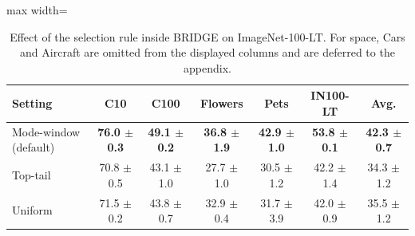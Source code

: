 \begin{table}[t]
\centering
\scriptsize
\setlength{\tabcolsep}{3.5pt}
\caption{Effect of the selection rule inside BRIDGE on ImageNet-100-LT. For space, Cars and Aircraft are omitted from the displayed columns and are deferred to the appendix.}
\label{tab:main_ablation_selection}
\begin{adjustbox}{max width=\textwidth}
\begin{tabular}{l c c c c c c}
\toprule
Setting & C10 & C100 & Flowers & Pets & IN100-LT & Avg. \\
\midrule
Mode-window (default) & \textbf{76.0 {\scriptsize$\pm$ 0.3}} & \textbf{49.1 {\scriptsize$\pm$ 0.2}} & \textbf{36.8 {\scriptsize$\pm$ 1.9}} & \textbf{42.9 {\scriptsize$\pm$ 1.0}} & \textbf{53.8 {\scriptsize$\pm$ 0.1}} & \textbf{42.3 {\scriptsize$\pm$ 0.7}} \\
Top-tail & 70.8 {\scriptsize$\pm$ 0.5} & 43.1 {\scriptsize$\pm$ 1.0} & 27.7 {\scriptsize$\pm$ 1.0} & 30.5 {\scriptsize$\pm$ 1.2} & 42.2 {\scriptsize$\pm$ 1.4} & 34.3 {\scriptsize$\pm$ 1.2} \\
Uniform & 71.5 {\scriptsize$\pm$ 0.2} & 43.8 {\scriptsize$\pm$ 0.7} & 32.9 {\scriptsize$\pm$ 0.4} & 31.7 {\scriptsize$\pm$ 3.9} & 42.0 {\scriptsize$\pm$ 0.9} & 35.5 {\scriptsize$\pm$ 1.2} \\
\bottomrule
\end{tabular}
\end{adjustbox}
\end{table}
